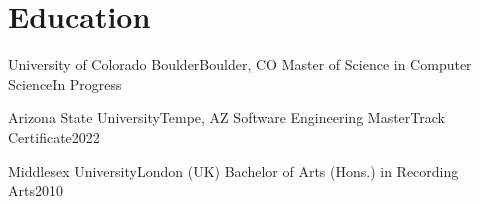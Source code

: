\section{Education}
  \resumeSubHeadingListStart
    
    \resumeSubheading
      {University of Colorado Boulder}{Boulder, CO}
      {Master of Science in Computer Science}{In Progress}

    \resumeSubheading
      {Arizona State University}{Tempe, AZ}
      {Software Engineering MasterTrack Certificate}{2022}
        \resumeItemListStart
        \resumeItemListEnd

    \resumeSubheading
      {Middlesex University}{London (UK)}
      {Bachelor of Arts (Hons.) in Recording Arts}{2010}
        \resumeItemListStart
        \resumeItemListEnd
  \resumeSubHeadingListEnd